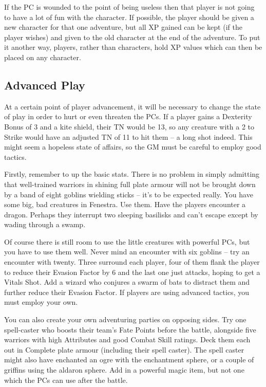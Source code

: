 If the PC is wounded to the point of being useless then that player is not going to have a lot of fun with the character. If possible, the player should be given a new character for that one adventure, but all XP gained can be kept (if the player wishes) and given to the old character at the end of the adventure. To put it another way, players, rather than characters, hold XP values which can then be placed on any character.

\subsection{Advanced Play}

At a certain point of player advancement, it will be necessary to change the state of play in order to hurt or even threaten the PCs.  If a player gains a Dexterity Bonus of 3 and a kite shield, their TN would be 13, so any creature with a 2 to Strike would have an adjusted TN of 11 to hit them -- a long shot indeed.  This might seem a hopeless state of affairs, so the GM must be careful to employ good tactics.

Firstly, remember to up the basic stats.  There is no problem in simply admitting that well-trained warriors in shining full plate armour will not be brought down by a band of eight goblins wielding sticks -- it's to be expected really.  You have some big, bad creatures in Fenestra.  Use them.  Have the players encounter a dragon.  Perhaps they interrupt two sleeping basilisks and can't escape except by wading through a swamp.

Of course there is still room to use the little creatures with powerful PCs, but you have to use them well.  Never mind an encounter with six goblins -- try an encounter with twenty.  Three surround each player, four of them flank the player to reduce their Evasion Factor by 6 and the last one just attacks, hoping to get a Vitals Shot.  Add a wizard who conjures a swarm of bats to distract them and further reduce their Evasion Factor.  If players are using advanced tactics, you must employ your own.

You can also create your own adventuring parties on opposing sides.  Try one spell-caster who boosts their team's Fate Points before the battle, alongside five warriors with high Attributes and good Combat Skill ratings.  Deck them each out in Complete plate armour (including their spell caster).  The spell caster might also have enchanted an ogre with the enchantment sphere, or a couple  of griffins using the aldaron sphere.  Add in a powerful magic item, but not one which the PCs can use after the battle.

